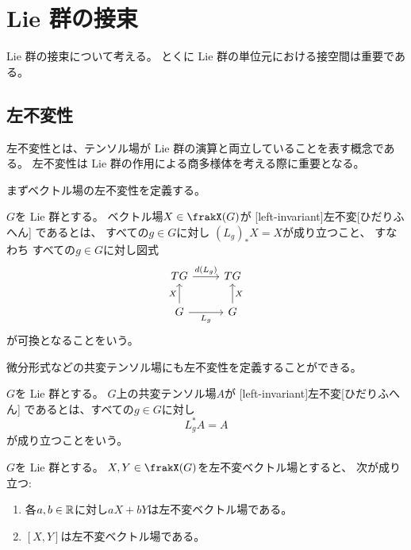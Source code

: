 \documentclass[report]{jlreq}
\begin{document}
\section{Lie 群の接束}

Lie 群の接束について考える。
とくに Lie 群の単位元における接空間は重要である。

\subsection{左不変性}

左不変性とは、テンソル場が Lie 群の演算と両立していることを表す概念である。
左不変性は Lie 群の作用による商多様体を考える際に重要となる。

まずベクトル場の左不変性を定義する。

\begin{definition}[左不変ベクトル場]
    $G$を Lie 群とする。
    ベクトル場$X \in \frakX(G)$が
    [left-invariant]{左不変}[ひだりふへん]
    であるとは、
    すべての$g \in G$に対し
    $(L_g)_* X = X$が成り立つこと、
    すなわち
    すべての$g \in G$に対し図式
    \begin{equation}
        \begin{tikzcd}
            TG \ar{r}{d(L_g)} & TG \\
            G \ar{u}{X} \ar{r}[swap]{L_g} & G \ar{u}[swap]{X}
        \end{tikzcd}
    \end{equation}
    が可換となることをいう。
\end{definition}

微分形式などの共変テンソル場にも左不変性を定義することができる。

\begin{definition}[左不変共変テンソル場]
    $G$を Lie 群とする。
    $G$上の共変テンソル場$A$が
    [left-invariant]{左不変}[ひだりふへん]
    であるとは、すべての$g \in G$に対し
    \begin{equation}
        L_g^* A = A
    \end{equation}
    が成り立つことをいう。
\end{definition}

\begin{lemma}
    $G$を Lie 群とする。
    $X, Y \in \frakX(G)$を左不変ベクトル場とすると、
    次が成り立つ:
    \begin{enumerate}
        \item 各$a, b \in \mathbb{R}$に対し$aX + bY$は左不変ベクトル場である。
        \item $[X, Y]$は左不変ベクトル場である。
    \end{enumerate}
\end{lemma}
\end{document}
